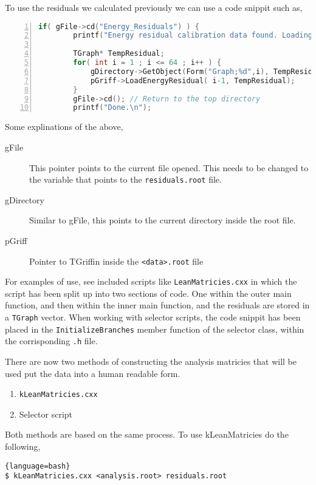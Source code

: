 \documentclass[10pt]{article} %
\begin{document}
To use the residuals we calculated previously we can use a code snippit such as,
\begin{lstlisting}[language=c++,numbers=left, xleftmargin=5.0ex,caption=Example residual code for loading residuals]
    if( gFile->cd("Energy_Residuals") ) {
        printf("Energy residual calibration data found. Loading...\n");

        TGraph* TempResidual;
        for( int i = 1 ; i <= 64 ; i++ ) {
            gDirectory->GetObject(Form("Graph;%d",i), TempResidual);
            pGriff->LoadEnergyResidual( i-1, TempResidual);
        }
        gFile->cd(); // Return to the top directory
        printf("Done.\n");
\end{lstlisting}
Some explinations of the above,
\begin{description}
\item [gFile]
This pointer points to the current file opened. This needs to be changed to the variable that points to the \texttt{residuals.root} file.
\item [gDirectory]
Similar to gFile, this points to the current directory inside the root file.
\item [pGriff]
Pointer to TGriffin inside the \texttt{<data>.root} file
\end{description}
For examples of use, see included scripts like \texttt{LeanMatricies.cxx} in which the script has been split up into two sections of code.
One within the outer main function, and then within the inner main function, and the residuals are stored in a \texttt{TGraph} vector.
When working with selector scripts, the code snippit has been placed in the \texttt{InitializeBranches} member function of the selector class, within the corrisponding \texttt{.h} file.

There are now two methods of constructing the analysis matricies that will be used put the data into a human readable form.

\begin{enumerate}
\item  \texttt{kLeanMatricies.cxx}
\item Selector script
\end{enumerate}

Both methods are based on the same process. To use kLeanMatricies do the following,

\begin{lstlisting}{language=bash}
$ kLeanMatricies.cxx <analysis.root> residuals.root
\end{lstlisting}
\end{document}
